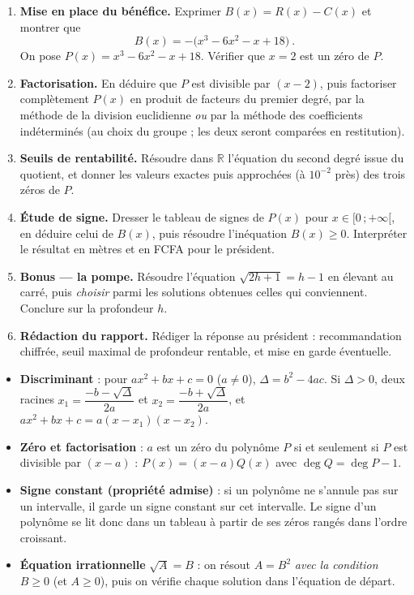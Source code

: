\documentclass[11pt]{article}
\newcounter{popsec}
\newcounter{popsub}
\newcommand{\courssub}[1]{%
  \stepcounter{popsub}%
  \par\vspace{9pt}\noindent{\popxbold\fontsize{11.5}{13}\selectfont\color{popink}{\color{poporange}\thepopsec.\thepopsub}\hspace{6pt}#1}\par\nopagebreak\vspace{4pt}
}
\begin{document}
\begin{enumerate}
\item \textbf{Mise en place du bénéfice.} Exprimer $B(x)=R(x)-C(x)$ et montrer que
\[ B(x)=-\bigl(x^{3}-6x^{2}-x+18\bigr)\ .\]
On pose $P(x)=x^{3}-6x^{2}-x+18$. Vérifier que $x=2$ est un zéro de $P$.
\item \textbf{Factorisation.} En déduire que $P$ est divisible par $(x-2)$, puis factoriser complètement $P(x)$ en produit de facteurs du premier degré, par la méthode de la division euclidienne \emph{ou} par la méthode des coefficients indéterminés (au choix du groupe ; les deux seront comparées en restitution).
\item \textbf{Seuils de rentabilité.} Résoudre dans $\mathbb{R}$ l'équation du second degré issue du quotient, et donner les valeurs exactes puis approchées (à $10^{-2}$ près) des trois zéros de $P$.
\item \textbf{Étude de signe.} Dresser le tableau de signes de $P(x)$ pour $x\in[0\,;+\infty[$, en déduire celui de $B(x)$, puis résoudre l'inéquation $B(x)\geq 0$. Interpréter le résultat en mètres et en FCFA pour le président.
\item \textbf{Bonus — la pompe.} Résoudre l'équation $\sqrt{2h+1}=h-1$ en élevant au carré, puis \emph{choisir} parmi les solutions obtenues celles qui conviennent. Conclure sur la profondeur $h$.
\item \textbf{Rédaction du rapport.} Rédiger la réponse au président : recommandation chiffrée, seuil maximal de profondeur rentable, et mise en garde éventuelle.
\end{enumerate}

\courssub{Ressources à mobiliser}

\begin{aretenir}
\begin{itemize}
\item \textbf{Discriminant} : pour $ax^{2}+bx+c=0$ ($a\neq 0$), $\Delta=b^{2}-4ac$. Si $\Delta>0$, deux racines $x_{1}=\dfrac{-b-\sqrt{\Delta}}{2a}$ et $x_{2}=\dfrac{-b+\sqrt{\Delta}}{2a}$, et $ax^{2}+bx+c=a(x-x_{1})(x-x_{2})$.
\item \textbf{Zéro et factorisation} : $a$ est un zéro du polynôme $P$ si et seulement si $P$ est divisible par $(x-a)$ : $P(x)=(x-a)Q(x)$ avec $\deg Q=\deg P -1$.
\item \textbf{Signe constant (propriété admise)} : si un polynôme ne s'annule pas sur un intervalle, il garde un signe constant sur cet intervalle. Le signe d'un polynôme se lit donc dans un tableau à partir de ses zéros rangés dans l'ordre croissant.
\item \textbf{Équation irrationnelle} $\sqrt{A}=B$ : on résout $A=B^{2}$ \emph{avec la condition} $B\geq 0$ (et $A\geq 0$), puis on vérifie chaque solution dans l'équation de départ.
\end{itemize}
\end{aretenir}
\end{document}
